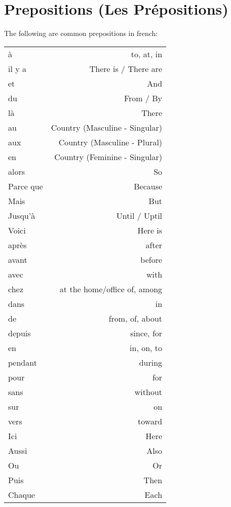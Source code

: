\section{Prepositions (Les Pr\'epositions)}


The following are common prepositions in french:

\vspace{0.3in}

\begin{tabular}{l  r}
\`a       & to, at, in  \\
il y a    & There is / There are \\
et        & And \\
du        & From / By \\
l\`a      & There \\
au        & Country (Masculine - Singular) \\
aux       & Country (Masculine - Plural) \\
en        & Country (Feminine - Singular) \\
alors     & So \\
Parce que & Because \\
Mais      & But \\
Jusqu'\`a & Until / Uptil \\
Voici     & Here is \\
apr\`es   & after       \\
avant     & before      \\
avec      & with        \\
chez      & at the home/office of, among \\
dans      & in          \\
de        & from, of, about \\
depuis    & since, for  \\
en        & in, on, to \\
pendant   & during \\
pour      & for \\
sans      & without \\
sur       & on  \\
vers      & toward \\
Ici       & Here \\
Aussi     & Also \\
Ou        & Or \\
Puis      & Then \\
Chaque    & Each \\
\end{tabular}


